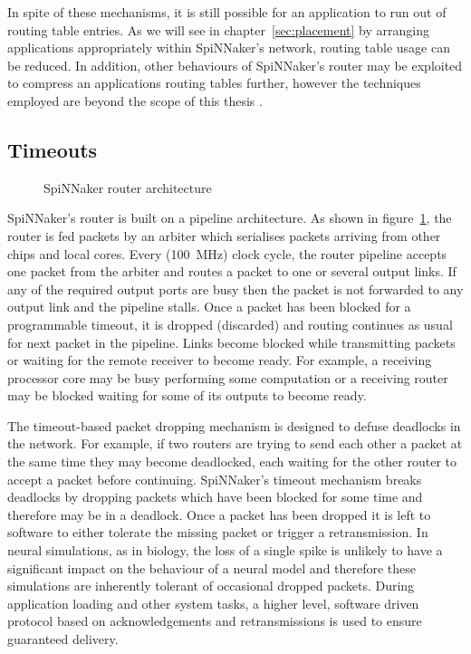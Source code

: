 			In spite of these mechanisms, it is still possible for an application to
			run out of routing table entries. As we will see in
			chapter~\ref{sec:placement} by arranging applications appropriately
			within SpiNNaker's network, routing table usage can be reduced. In
			addition, other behaviours of SpiNNaker's router may be exploited to
			compress an applications routing tables further, however the techniques
			employed are beyond the scope of this thesis \cite{mundy16}.
		
		\subsection{Timeouts}
			
			\begin{figure}
				\center
				
				\caption{SpiNNaker router architecture}
				\label{fig:router-architecture}
			\end{figure}
			
			SpiNNaker's router is built on a pipeline architecture. As shown in
			figure~\ref{fig:router-architecture}, the router is fed packets by an
			arbiter which serialises packets arriving from other chips and local
			cores. Every (\SI{100}{\mega\hertz}) clock cycle, the router pipeline
			accepts one packet from the arbiter and routes a packet to one or several
			output links. If any of the required output ports are busy then the
			packet is not forwarded to any output link and the pipeline stalls. Once
			a packet has been blocked for a programmable timeout, it is dropped
			(discarded) and routing continues as usual for next packet in the
			pipeline. Links become blocked while transmitting packets or waiting for
			the remote receiver to become ready. For example, a receiving processor
			core may be busy performing some computation or a receiving router may be
			blocked waiting for some of its outputs to become ready.
			
			The timeout-based packet dropping mechanism is designed to defuse
			deadlocks in the network. For example, if two routers are trying to send
			each other a packet at the same time they may become deadlocked, each
			waiting for the other router to accept a packet before continuing.
			SpiNNaker's timeout mechanism breaks deadlocks by dropping packets which
			have been blocked for some time and therefore may be in a deadlock.  Once
			a packet has been dropped it is left to software to either tolerate the
			missing packet or trigger a retransmission. In neural simulations, as in
			biology, the loss of a single spike is unlikely to have a significant
			impact on the behaviour of a neural model and therefore these simulations
			are inherently tolerant of occasional dropped packets. During application
			loading and other system tasks, a higher level, software driven protocol
			based on acknowledgements and retransmissions is used to ensure
			guaranteed delivery.
			
